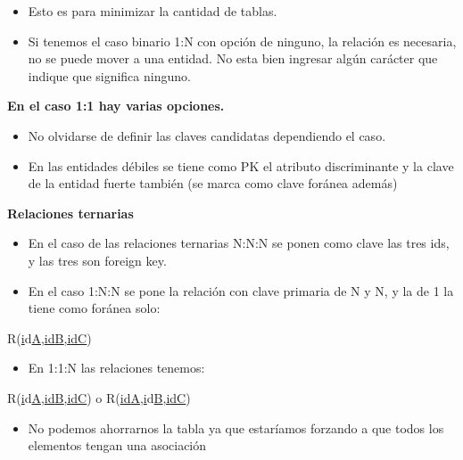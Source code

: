 \begin{itemize}
\item Esto es para minimizar la cantidad de tablas.
\item Si tenemos el caso binario 1:N con opción de ninguno, la relación es necesaria, no se puede mover a una entidad. No esta bien ingresar algún carácter que indique que significa ninguno.
\end{itemize}

\medskip

\textbf{En el caso 1:1 hay varias opciones.}

\begin{itemize}
\item No olvidarse de definir las claves candidatas dependiendo el caso.
\item En las entidades débiles se tiene como PK el atributo discriminante y la clave de la entidad fuerte también (se marca como clave foránea además)
\end{itemize}

\medskip

\textbf{Relaciones ternarias}

\begin{itemize}
\item En el caso de las relaciones ternarias N:N:N se ponen como clave las tres ids, y las tres son foreign key.
\item En el caso 1:N:N se pone la relación con clave primaria de N y N, y la de 1 la tiene como foránea solo:
\end{itemize}
R(\underline{i}d\underline{A},\underline{\underline{i}d\underline{B}},\underline{\underline{i}d\underline{C}})

\medskip

\begin{itemize}
\item En 1:1:N las relaciones tenemos:
\end{itemize}
R(\underline{i}d\underline{A},\underline{\underline{i}d\underline{B}},\underline{\underline{i}d\underline{C}}) o 
R(\underline{\underline{i}d\underline{A}},\underline{i}d\underline{B},\underline{\underline{i}d\underline{C}})

\medskip

\begin{itemize}
\item No podemos ahorrarnos la tabla ya que estaríamos forzando a que todos los elementos tengan una asociación
\end{itemize}

